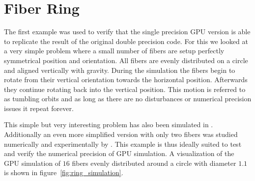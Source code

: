 \documentclass[a4paper,11pt]{kth-mag}
\begin{document}
\section{Fiber Ring}
\label{sec:example_ring}

The first example was used to verify that the single precision GPU version is able to replicate the result of the original double precision code. For this we looked at a very simple problem where a small number of fibers are setup perfectly symmetrical position and orientation. All fibers are evenly distributed on a circle and aligned vertically with gravity. During the simulation the fibers begin to rotate from their vertical orientation towards the horizontal position. Afterwards they continue rotating back into the vertical position. This motion is referred to as tumbling orbits and as long as there are no disturbances or numerical precision issues it repeat forever.

This simple but very interesting problem has also been simulated in \cite{}. Additionally an even more simplified version with only two fibers was studied numerically and experimentally by \cite{}. This example is thus ideally suited to test and verify the numerical precision of GPU simulation. A visualization of the GPU simulation of $16$ fibers evenly distributed around a circle with diameter $1.1$ is shown in figure~\ref{fig:ring_simulation}.
\end{document}
